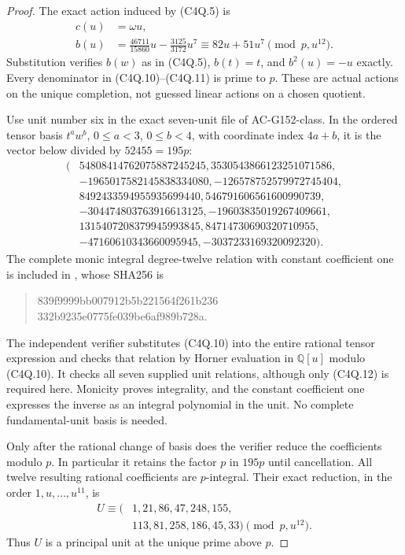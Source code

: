 \begin{proof}
The exact action induced by (C4Q.5) is
\[
 \begin{aligned}
 c(u)&=\omega u,\\
 b(u)&=\frac{46711}{15860}u-\frac{3125}{3172}u^7
       \equiv82u+51u^7\pmod{p,u^{12}}.
 \end{aligned}
 \tag{C4Q.11}
\]
Substitution verifies $b(w)$ as in (C4Q.5), $b(t)=t$,
and $b^2(u)=-u$ exactly.
Every denominator in (C4Q.10)--(C4Q.11) is prime to $p$.
These are actual actions on the unique completion, not guessed
linear actions on a chosen quotient.

Use unit number six in the exact seven-unit file of AC-G152-class.
In the ordered tensor basis $t^aw^b$, $0\leq a<3$, $0\leq b<4$,
with coordinate index $4a+b$, it is the vector below divided by
$52455=195p$:
\[
 \begin{aligned}
 (&54808414762075887245245,
       3530543866123251071586,\\
  &-1965017582145838334080,
       -126578752579972745404,\\
  &8492433594955935699440,
       546791606561600990739,\\
  &-304474803763916613125,
       -19603835019267409661,\\
  &1315407208379945993845,
       84714730690320710955,\\
  &-47160610343660095945,
       -3037233169320092320).
 \end{aligned}
 \tag{C4Q.12}
\]
The complete monic integral degree-twelve relation with constant
coefficient one is included in
, whose SHA256 is
\begin{quote}\ttfamily\small
839f9999bb007912b5b221564f261b236\\
332b9235e0775fe039be6af989b728a.
\end{quote}
The independent verifier substitutes (C4Q.10) into the entire
rational tensor expression and checks that relation by Horner
evaluation in $\mathbb Q[u]$ modulo (C4Q.10).
It checks all seven supplied unit relations, although only (C4Q.12)
is required here.  Monicity proves integrality, and the constant
coefficient one expresses the inverse as an integral polynomial
in the unit.  No complete fundamental-unit basis is needed.

Only after the rational change of basis does the verifier reduce
the coefficients modulo $p$.
In particular it retains the factor $p$ in $195p$ until cancellation.
All twelve resulting rational coefficients are $p$-integral.
Their exact reduction, in the order $1,u,\ldots,u^{11}$, is
\[
 \begin{aligned}
 U\equiv(&1,21,86,47,248,155,\\
         &113,81,258,186,45,33)\pmod{p,u^{12}}.
 \end{aligned}
 \tag{C4Q.13}
\]
Thus $U$ is a principal unit at the unique prime above $p$.


\end{proof}
